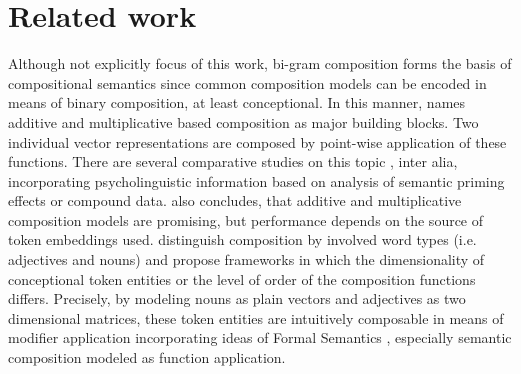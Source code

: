 \section{Related work}
\label{sec:related_work}

Although not explicitly focus of this work, bi-gram composition forms the basis of compositional semantics since common composition models can be encoded in means of binary composition, at least conceptional. In this manner, \textcite{zanzotto_estimating_2010} names additive and multiplicative based composition as major building blocks. Two individual vector representations are composed by point-wise application of these functions. There are several comparative studies on this topic \autocite{mitchell_composition_2010, dima_reverse-engineering_2015}, inter alia, incorporating psycholinguistic information based on analysis of semantic priming effects or compound data. \textcite{mitchell_composition_2010} also concludes, that additive and multiplicative composition models are promising, but performance depends on the source of token embeddings used. %
\textcite{baroni_nouns_2010, clark_type-driven_2013, grefenstette_multi-step_2013, baroni_frege_2014}  	distinguish composition by involved word types (i.e. adjectives and nouns) and propose frameworks in which the dimensionality of conceptional token entities or the level of order of the composition functions differs. Precisely, by modeling nouns as plain vectors and adjectives as two dimensional matrices, these token entities are intuitively composable in means of modifier application incorporating ideas of Formal Semantics \autocite{montague_proper_1973}, especially semantic composition modeled as function application. %

